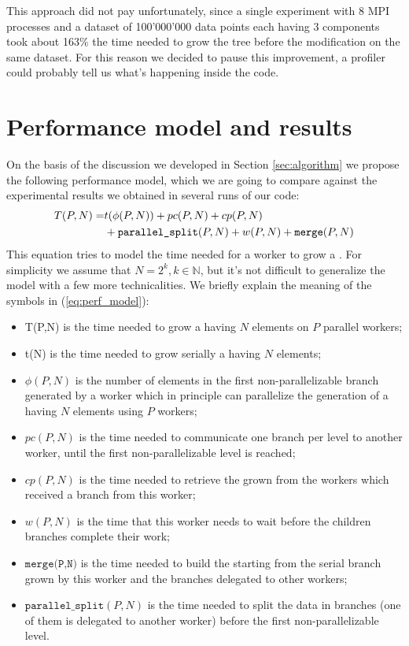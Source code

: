 \documentclass{article}
\begin{document}
This approach did not pay unfortunately, since a single experiment with 8 MPI
processes and a dataset of 100'000'000 data points each having 3 components
took about 163\% the time needed to grow the tree before the modification on the
same dataset. For this reason we decided to pause this improvement, a profiler
could probably tell us what's happening inside the code.

\section{Performance model and results} \label{sec:performance}
On the basis of the discussion we developed in Section \ref{sec:algorithm} we
propose the following performance model, which we are going to compare against
the experimental results we obtained in several runs of our code:
\begin{align}\label{eq:perf_model}
    T(P,N) = &t(\phi(P,N)) + pc(P,N) + cp(P,N)\notag\\
    &+ \texttt{parallel\_split}(P,N) + w(P,N) + \texttt{merge}(P, N)
\end{align}
This equation tries to model the time needed for a worker to grow a \kdtree{}.
For simplicity we assume that $N = 2^k, k \in \mathbb{N}$, but it's not
difficult to generalize the model with a few more technicalities. We briefly
explain the meaning of the symbols in (\ref*{eq:perf_model}):
\begin{itemize}
    \item T(P,N) is the time needed to grow a \kdtree{} having $N$ elements
    on $P$ parallel workers;
    \item t(N) is the time needed to grow serially a \kdtree{} having $N$
    elements;
    \item $\phi(P,N)$ is the number of elements in the first non-parallelizable
    branch generated by a worker which in principle can parallelize the
    generation of a \kdtree{} having $N$ elements using $P$ workers;
    \item $pc(P,N)$ is the time needed to communicate one branch per level to
    another worker, until the first non-parallelizable level is reached;
    \item $cp(P,N)$ is the time needed to retrieve the grown \kdtree{} from the
    workers which received a branch from this worker;
    \item $w(P,N)$ is the time that this worker needs to wait before the
    children branches complete their work;
    \item $\texttt{merge(P,N)}$ is the time needed to build the \kdtree{}
    starting from the serial branch grown by this worker and the branches
    delegated to other workers;
    \item $\texttt{parallel\_split}(P,N)$ is the time needed to split the data
    in branches (one of them is delegated to another worker) before the first
    non-parallelizable level.
\end{itemize}
\end{document}
